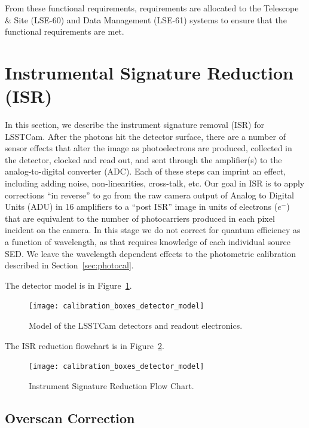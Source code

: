 \documentclass[SE,authoryear,lsstdraft,toc]{lsstdoc}
\newcommand{\etron}{e^{-}}
\begin{document}
From these functional requirements, requirements are allocated to the Telescope
\& Site (LSE-60) and Data Management (LSE-61) systems to ensure that the
functional requirements are met.

\section{Instrumental Signature Reduction (ISR)}

In this section, we describe the instrument signature removal (ISR) for
LSSTCam.  After the photons hit the detector surface, there are a number of
sensor effects that alter the image as photoelectrons are produced, collected
in the detector, clocked and read out, and sent through the amplifier(s) to the
analog-to-digital converter (ADC).  Each of these steps can imprint an effect,
including adding noise, non-linearities, cross-talk, etc.  Our goal in ISR is
to apply corrections ``in reverse'' to go from the raw camera output of Analog
to Digital Units (ADU) in 16 amplifiers to a ``post ISR'' image in units of
electrons ($\etron$) that are equivalent to the number of photocarriers
produced in each pixel incident on the camera.  In this stage we do not correct
for quantum efficiency as a function of wavelength, as that requires knowledge
of each individual source SED.  We leave the wavelength dependent effects to
the photometric calibration described in Section~\ref{sec:photocal}.

The detector model is in Figure~\ref{fig:detector_model}.


\begin{figure}[htb]
\centering
\texttt{[image: calibration\_boxes\_detector\_model]}
\caption{Model of the LSSTCam detectors and readout electronics.}
\label{fig:detector_model}
\vspace{0.1cm}
\end{figure}

The ISR reduction flowchart  is in Figure~\ref{fig:isr_model}.

\begin{figure}[htb]
\centering
\texttt{[image: calibration\_boxes\_detector\_model]}
\caption{Instrument Signature Reduction Flow Chart.}
\label{fig:isr_model}
\vspace{0.1cm}
\end{figure}


\subsection{Overscan Correction}
\end{document}
